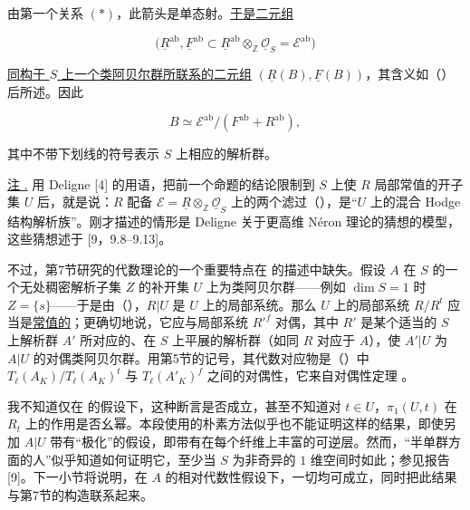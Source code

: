 \noindent
由第一个关系 $(*)$，此箭头是单态射。\underline{于是二元组}

\begin{equation*}
 \bigl(\underline R^{\mathrm{ab}},
 \underline F^{\mathrm{ab}}\subset
 \underline R^{\mathrm{ab}}\otimes_{\mathbb Z}
 \underline{\mathcal O}_S=\mathcal E^{\mathrm{ab}}\bigr)
\end{equation*}

\noindent
\underline{同构于 $S$ 上一个类阿贝尔群所联系的二元组} $(\underline R(B),\underline F(B))$，其含义如（）后所述。因此

\begin{equation*}
 B\simeq\mathcal E^{\mathrm{ab}}/
 (F^{\mathrm{ab}}+R^{\mathrm{ab}}),
\end{equation*}

\noindent
其中不带下划线的符号表示 $S$ 上相应的解析群。

\medskip
\noindent
\underline{注 .} 用 Deligne [4] 的用语，把前一个命题的结论限制到 $S$ 上使 $R$ 局部常值的开子集 $U$ 后，就是说：$R$ 配备 $\mathcal E=\underline R\otimes_{\mathbb Z}\underline{\mathcal O}_S$ 上的两个滤过（），是“$U$ 上的混合 Hodge 结构解析族”。刚才描述的情形是 Deligne 关于更高维 N\'eron 理论的猜想的模型，这些猜想述于 [9，9.8--9.13]。

不过，第7节研究的代数理论的一个重要特点在  的描述中缺失。假设 $A$ 在 $S$ 的一个无处稠密解析子集 $Z$ 的补开集 $U$ 上为类阿贝尔群——例如 $\dim S=1$ 时 $Z=\{s\}$——于是由（），$R|U$ 是 $U$ 上的局部系统。那么 $U$ 上的局部系统 $R/R^t$ 应当是\underline{常值的}；更确切地说，它应与局部系统 ${R'}^f$ 对偶，其中 $R'$ 是某个适当的 $S$ 上解析群 $A'$ 所对应的、在 $S$ 上平展的解析群（如同 $R$ 对应于 $A$），使 $A'|U$ 为 $A|U$ 的对偶类阿贝尔群。用第5节的记号，其代数对应物是（）中 $T_\ell(A_K)/T_\ell(A_K)^t$ 与 $T_\ell(A'_K)^f$ 之间的对偶性，它来自对偶性定理 。

我不知道仅在  的假设下，这种断言是否成立，甚至不知道对 $t\in U$，$\pi_1(U,t)$ 在 $R_t$ 上的作用是否幺幂。本段使用的朴素方法似乎也不能证明这样的结果，即使另加 $A|U$ 带有“极化”的假设，即带有在每个纤维上丰富的可逆层。然而，“半单群方面的人”似乎知道如何证明它，至少当 $S$ 为非奇异的 $1$ 维空间时如此；参见报告 [9]。下一小节将说明，在 $A$ 的相对代数性假设下，一切均可成立，同时把此结果与第7节的构造联系起来。

